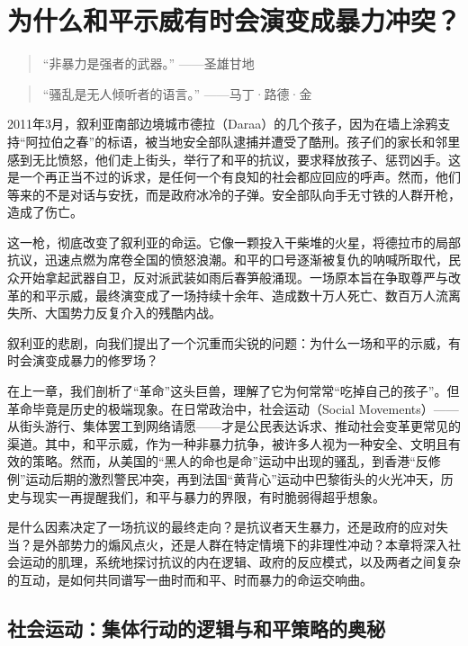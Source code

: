 \chapter{为什么和平示威有时会演变成暴力冲突？}
\label{chapter:peaceful_protest_to_violence}

\begin{quote}
“非暴力是强者的武器。” ——圣雄甘地
\end{quote}

\begin{quote}
“骚乱是无人倾听者的语言。” ——马丁·路德·金
\end{quote}

2011年3月，叙利亚南部边境城市德拉（Daraa）的几个孩子，因为在墙上涂鸦支持“阿拉伯之春”的标语，被当地安全部队逮捕并遭受了酷刑。孩子们的家长和邻里感到无比愤怒，他们走上街头，举行了和平的抗议，要求释放孩子、惩罚凶手。这是一个再正当不过的诉求，是任何一个有良知的社会都应回应的呼声。然而，他们等来的不是对话与安抚，而是政府冰冷的子弹。安全部队向手无寸铁的人群开枪，造成了伤亡。

这一枪，彻底改变了叙利亚的命运。它像一颗投入干柴堆的火星，将德拉市的局部抗议，迅速点燃为席卷全国的愤怒浪潮。和平的口号逐渐被复仇的呐喊所取代，民众开始拿起武器自卫，反对派武装如雨后春笋般涌现。一场原本旨在争取尊严与改革的和平示威，最终演变成了一场持续十余年、造成数十万人死亡、数百万人流离失所、大国势力反复介入的残酷内战。

叙利亚的悲剧，向我们提出了一个沉重而尖锐的问题：为什么一场和平的示威，有时会演变成暴力的修罗场？

在上一章，我们剖析了“革命”这头巨兽，理解了它为何常常“吃掉自己的孩子”。但革命毕竟是历史的极端现象。在日常政治中，社会运动（Social Movements）——从街头游行、集体罢工到网络请愿——才是公民表达诉求、推动社会变革更常见的渠道。其中，和平示威，作为一种非暴力抗争，被许多人视为一种安全、文明且有效的策略。然而，从美国的“黑人的命也是命”运动中出现的骚乱，到香港“反修例”运动后期的激烈警民冲突，再到法国“黄背心”运动中巴黎街头的火光冲天，历史与现实一再提醒我们，和平与暴力的界限，有时脆弱得超乎想象。

是什么因素决定了一场抗议的最终走向？是抗议者天生暴力，还是政府的应对失当？是外部势力的煽风点火，还是人群在特定情境下的非理性冲动？本章将深入社会运动的肌理，系统地探讨抗议的内在逻辑、政府的反应模式，以及两者之间复杂的互动，是如何共同谱写一曲时而和平、时而暴力的命运交响曲。

\section{社会运动：集体行动的逻辑与和平策略的奥秘}

